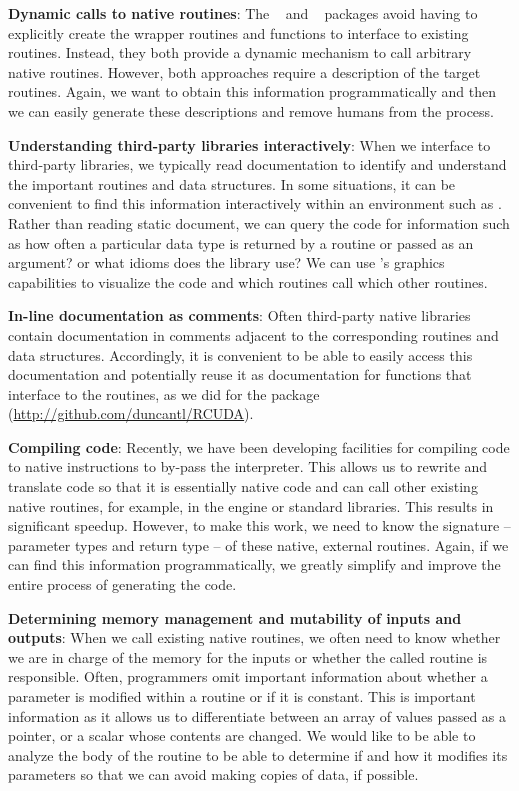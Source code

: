 \documentclass[article]{jss}
\def\C{\proglang{C}}
\def\R{\proglang{R}}
\def\Rpkg#1{\pkg{#1}}
\begin{document}
\textbf{Dynamic calls to native routines}: The
\Rpkg{rdyncall}~\citep{bib:rdyncall} and \Rpkg{Rffi}~\citep{bib:Rffi}
\R{} packages avoid having to explicitly create the wrapper routines
and \R{} functions to interface to existing \C{} routines. Instead,
they both provide a dynamic mechanism to call arbitrary native
routines.  However, both approaches require a description of the
target routines.  Again, we want to obtain this information
programmatically and then we can easily generate these descriptions
and remove humans from the process.

\textbf{Understanding third-party libraries interactively}: When we
interface to third-party libraries, we typically read documentation to
identify and understand the important routines and data structures.
In some situations, it can be convenient to find this information
interactively within an environment such as \R.  Rather than reading
static document, we can query the code for information such as how
often a particular data type is returned by a routine or passed as an
argument? or what idioms does the library use?  We can use \R's
graphics capabilities to visualize the code and which routines call
which other routines.

\textbf{In-line documentation as comments}: Often third-party native
libraries contain documentation in comments adjacent to the corresponding
routines and data structures.  Accordingly, it is convenient to be able to easily
access this documentation and potentially reuse it as \R{}
documentation for functions that interface to the routines, as we did
for the \Rpkg{RCUDA} package (\url{http://github.com/duncantl/RCUDA}).

\textbf{Compiling \R{} code}: Recently, we have been developing \R{}
facilities for compiling \R{} code to native instructions to by-pass
the \R{} interpreter.  This allows us to rewrite and translate \R{}
code so that it is essentially native code and can call other existing
native routines, for example, in the \R{} engine or standard \C{}
libraries.  This results in significant speedup.  However, to make
this work, we need to know the signature -- parameter types and return
type -- of these native, external routines.  Again, if we can find
this information programmatically, we greatly simplify and improve the
entire process of generating the code.


\textbf{Determining memory management and mutability of inputs and
  outputs}: When we call existing native routines, we often need
to know whether we are in charge of the memory for the inputs or
whether the called routine is responsible.  Often, programmers omit
important information about whether a parameter is modified within a
routine or if it is constant.  This is important information as it
allows us to differentiate between an array of values passed as a
pointer, or a scalar whose contents are changed.  We would like to be
able to analyze the body of the routine to be able to determine if and
how it modifies its parameters so that we can avoid making copies of
data, if possible.
\end{document}
